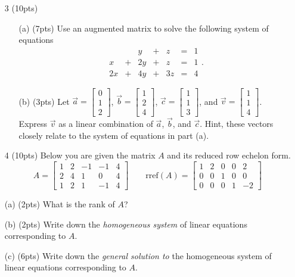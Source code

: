 \documentclass{article}
\newcommand{\mat}[1]{\begin{bmatrix}#1\end{bmatrix}}
\begin{document}
\begin{enumerate}
\begin{enumerate}
	
	\end{enumerate}
	\clearpage
	
	\item[3 (10pts)] $\phantom{xx}$
	\begin{enumerate}
		\item[(a) (7pts)]
		Use an augmented matrix to solve the following system of equations
		\[\begin{array}{rrrrrrc}
				&&   y &+&  z &   = & 1 \\
				x &   +&2y&+&  z &  = & 1 \\
				2x &  +& 4y&+&3 z  & = &  4 
		\end{array}.\]

		\vspace{6in}

		\item[(b) (3pts)] Let $\vec a=\mat{0\\1\\2}$, $\vec b=\mat{1\\2\\4}$, $\vec c=\mat{1\\1\\3}$, and $\vec v=\mat{1\\1\\4}$.
			Express $\vec v$ as a linear combination of $\vec a$, $\vec b$, and $\vec c$. Hint, these vectors 
			closely relate to the system of equations in part (a).
	\end{enumerate}
	\clearpage

	\item[4 (10pts)] Below you are given the matrix $A$ and its reduced row echelon form.
		\[
			A=\mat{
				1 &  2 & -1 & -1 &  4\\
				2 &  4 &  1 &  0 &  4\\
				1 &  2 &  1 & -1 &  4
				   }\qquad
				\mathrm{rref}(A)=\mat{
				 1 &  2 &  0 &  0 &  2\\
				 0 &  0 &  1 &  0 &  0\\
				0 &  0 &  0 &  1 & -2}
		\]
		\item[(a) (2pts)]
			What is the rank of $A$?

		\vspace{1in}

	\item[(b) (2pts)] Write down the \emph{homogeneous system} of linear equations corresponding
			to $A$.
		\vspace{1in}

	\item[(c) (6pts)] Write down the \emph{general solution to} the homogeneous system of linear equations corresponding
			to $A$.



\end{enumerate}
\end{document}
